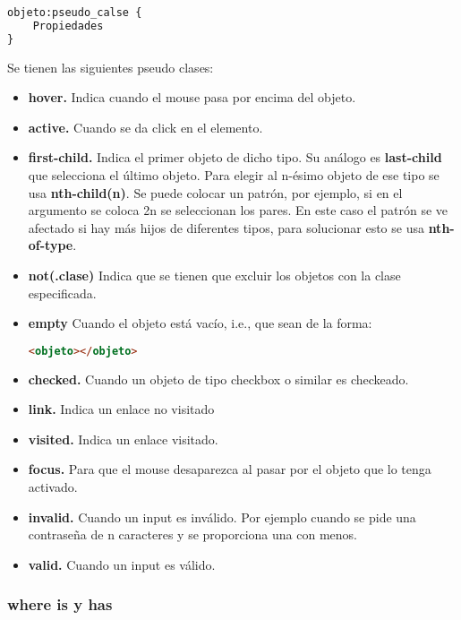 \documentclass[10pt,oneside]{article}
\begin{document}
\begin{multicols}{2}
    \begin{lstlisting}[language=HTML]
objeto:pseudo_calse {
    Propiedades
}       
    \end{lstlisting}

    Se tienen las siguientes pseudo clases:

    \begin{itemize}
        \item \textbf{hover.} Indica cuando el mouse pasa por encima del objeto.
        \item \textbf{active.} Cuando se da click en el elemento.
        \item \textbf{first-child.} Indica el primer objeto de dicho tipo. Su análogo es \textbf{last-child} que selecciona el último objeto. Para elegir al n-ésimo objeto de ese tipo se usa \textbf{nth-child(n)}. Se puede colocar un patrón, por ejemplo, si en el argumento se coloca 2n se seleccionan los pares. En este caso el patrón se ve afectado si hay más hijos de diferentes tipos, para solucionar esto se usa \textbf{nth-of-type}.   
        \item \textbf{not(.clase)} Indica que se tienen que excluir los objetos con la clase especificada.
        \item \textbf{empty} Cuando el objeto está vacío, i.e., que sean de la forma:

        \begin{lstlisting}[language=HTML]
<objeto></objeto>
        \end{lstlisting}
        \item \textbf{checked.} Cuando un objeto de tipo checkbox o similar es checkeado. 
        \item \textbf{link.} Indica un enlace no visitado 
        \item \textbf{visited.} Indica un enlace visitado.
        \item \textbf{focus.} Para que el mouse desaparezca al pasar por el objeto que lo tenga activado.
        \item \textbf{invalid.} Cuando un input es inválido. Por ejemplo cuando se pide una contraseña de n caracteres y se proporciona una con menos. 
        \item \textbf{valid.} Cuando un input es válido.
    \end{itemize}

\subsubsection{where is y has} 


\end{multicols}
\end{document}
